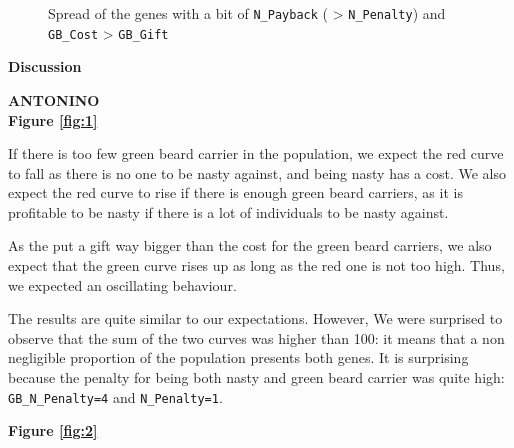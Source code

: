 \documentclass[12pt,a4paper]{article}
\newcommand{\parag}[1]{
  \vspace{8mm}
  \noindent
  {\LARGE\textbf{#1}}
  \vspace{3mm}
}
\newcommand{\A}{\textbf{ANTONINO}\\}
\begin{document}
\begin{figure}[htp] 
    \centering
    \hfill%
    \caption{Spread of the genes with a bit of \texttt{N\_Payback} ( > \texttt{N\_Penalty}) and \texttt{GB\_Cost} > \texttt{GB\_Gift}}
\end{figure}

\FloatBarrier
\parag{Discussion}

\A

\noindent\textbf{Figure \ref{fig:1}}
\vspace{1.5mm}

If there is too few green beard carrier in the population, we expect the red curve to fall as there is no one to be nasty against, and being nasty has a cost. We also expect the red curve to rise if there is enough green beard carriers, as it is profitable to be nasty if there is a lot of individuals to be nasty against.

As the put a gift way bigger than the cost for the green beard carriers, we also expect that the green curve rises up as long as the red one is not too high. Thus, we expected an oscillating behaviour.

The results are quite similar to our expectations. However, We were surprised to observe that the sum of the two curves was higher than 100: it means that a non negligible proportion of the population presents both genes. It is surprising because the penalty for being both nasty and green beard carrier was quite high: \texttt{GB\_N\_Penalty=4} and \texttt{N\_Penalty=1}.

\vspace{5mm}
\noindent\textbf{Figure \ref{fig:2}}
\vspace{1.5mm}
\end{document}
